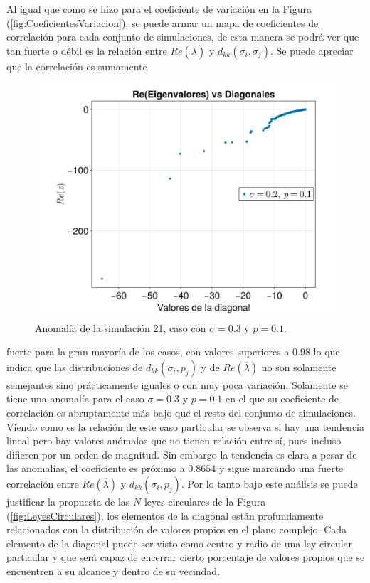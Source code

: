 \documentclass[a4paper,11pt]{book}
\theoremstyle{plain}
\theoremstyle{definition}
\begin{document}
Al igual que como se hizo para el coeficiente de variación en la Figura (\ref{fig:CoeficientesVariacion}), se puede armar un mapa de coeficientes de correlación para cada conjunto de simulaciones, de esta manera se podrá ver que tan fuerte o débil es la relación entre $Re(\overline{\lambda})$ y $d_{kk}(\sigma_i,\sigma_j)$. Se puede apreciar que la correlación es sumamente 
\begin{figure} \vspace{-30pt} \begin{center}
		\includegraphics[scale=0.135]{../Imagenes/AnomaliaSim21}
	\end{center}
	\vspace{-20pt} 
	\caption{Anomalía de la simulación 21, caso con $\sigma=0.3$ y $p=0.1$.}
	\vspace{-10pt}
	\label{fig:AnomaliaSim21}
\end{figure}
fuerte para la gran mayoría de los casos, con valores superiores a $0.98$ lo que indica que las distribuciones de $d_{kk}(\sigma_i,p_j)$ y de $Re(\overline{\lambda})$ no son solamente semejantes sino prácticamente iguales o con muy poca variación. Solamente se tiene una anomalía para el caso $\sigma=0.3$ y $p=0.1$ en el que su coeficiente de correlación es abruptamente más bajo que el resto del conjunto de simulaciones. Viendo como es la relación de este caso particular se observa si hay una tendencia lineal pero hay valores anómalos que no tienen relación entre sí, pues incluso difieren por un orden de magnitud. Sin embargo la tendencia es clara a pesar de las anomalías, el coeficiente es próximo a $0.8654$ y sigue marcando una fuerte correlación entre $Re(\overline{\lambda})$ y $d_{kk}(\sigma_i,p_j)$. Por lo tanto bajo este análisis se puede justificar la propuesta de las $N$ leyes circulares de la Figura (\ref{fig:LeyesCirculares}), los elementos de la diagonal están profundamente relacionados con la distribución de valores propios en el plano complejo. Cada elemento de la diagonal puede ser visto como centro y radio de una ley circular particular y que será capaz de encerrar cierto porcentaje de valores propios que se encuentren a su alcance y dentro de su vecindad.\\
\end{document}
